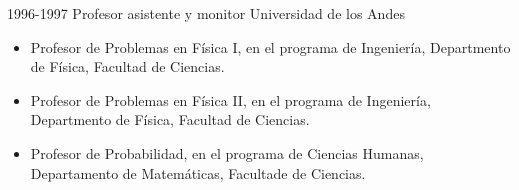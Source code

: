 \begin{entrylist}
  \entry
        {1996-1997}
	{Profesor asistente y monitor}
	{Universidad de los Andes}
	{\begin{itemize}
              \item Profesor de Problemas en Física I, en el programa de Ingeniería,
		      Departmento de Física, Facultad de Ciencias.
              \item Profesor de Problemas en Física II, en el programa de Ingeniería,
		      Departmento de Física, Facultad de Ciencias.
              \item Profesor de Probabilidad, en el programa de Ciencias Humanas, Departamento
		      de Matemáticas, Facultade de Ciencias.
	\end{itemize}}
\end{entrylist}
